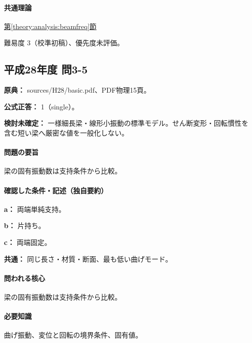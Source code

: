 \paragraph{共通理論} \hyperref[theory:analysis:beamfreq]{第\ref*{theory:analysis:beamfreq}節}

\par 難易度 3（校準初稿）、優先度未評価。

\subsection{平成28年度 問3-5}
\label{q:h28-reg-basic-3-5}

\noindent\textbf{原典：} sources/H28/basic.pdf、PDF物理15頁。

\textbf{公式正答：} 1（single）。

\par\textbf{検討未確定：} 一様細長梁・線形小振動の標準モデル。せん断変形・回転慣性を含む短い梁へ厳密な値を一般化しない。

\paragraph{問題の要旨} 梁の固有振動数は支持条件から比較。

\paragraph{確認した条件・記述（独自要約）}\mbox{}\par

\noindent\textbf{a：} 両端単純支持。\par

\noindent\textbf{b：} 片持ち。\par

\noindent\textbf{c：} 両端固定。\par

\noindent\textbf{共通：} 同じ長さ・材質・断面、最も低い曲げモード。\par

\paragraph{問われる核心} 梁の固有振動数は支持条件から比較。

\paragraph{必要知識} 曲げ振動、変位と回転の境界条件、固有値。

